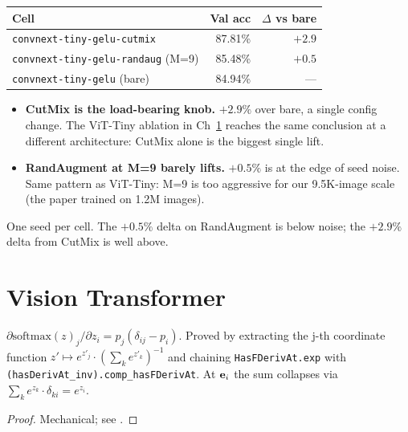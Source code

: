 \begin{center}
\begin{tabular}{l r r}
\hline
Cell                                          & Val acc & $\Delta$ vs bare \\
\hline
\texttt{convnext-tiny-gelu-cutmix}            & 87.81\% & $+2.9$ \\
\texttt{convnext-tiny-gelu-randaug} (M=9)     & 85.48\% & $+0.5$ \\
\texttt{convnext-tiny-gelu} (bare)            & 84.94\% & ---     \\
\hline
\end{tabular}
\end{center}

\begin{itemize}
  \item \textbf{CutMix is the load-bearing knob.} $+2.9\%$ over
    bare, a single config change. The ViT-Tiny ablation in
    Ch~\ref{chap:attention} reaches the same conclusion at a
    different architecture: CutMix alone is the biggest single lift.
  \item \textbf{RandAugment at M=9 barely lifts.} $+0.5\%$ is at
    the edge of seed noise. Same pattern as ViT-Tiny: M=9 is too
    aggressive for our 9.5K-image scale (the paper trained on
    1.2M images).
\end{itemize}

One seed per cell. The $+0.5\%$ delta on RandAugment is below
noise; the $+2.9\%$ delta from CutMix is well above.

\chapter{Vision Transformer}
\label{chap:attention}

\begin{theorem}
  \label{ax:pdiv_softmax}
  \leanok
  \(\partial \mathrm{softmax}(z)_j / \partial z_i = p_j (\delta_{ij} - p_i)\).
  Proved by extracting the j-th coordinate function
  \(z' \mapsto e^{z'_j} \cdot (\sum_k e^{z'_k})^{-1}\) and chaining
  \texttt{HasFDerivAt.exp} with \texttt{(hasDerivAt\_inv).comp\_hasFDerivAt}.
  At \(\mathbf{e}_i\) the sum collapses via \(\sum_k e^{z_k} \cdot \delta_{ki} = e^{z_i}\).
\end{theorem}

\begin{proof}
\leanok
Mechanical; see .
\end{proof}

